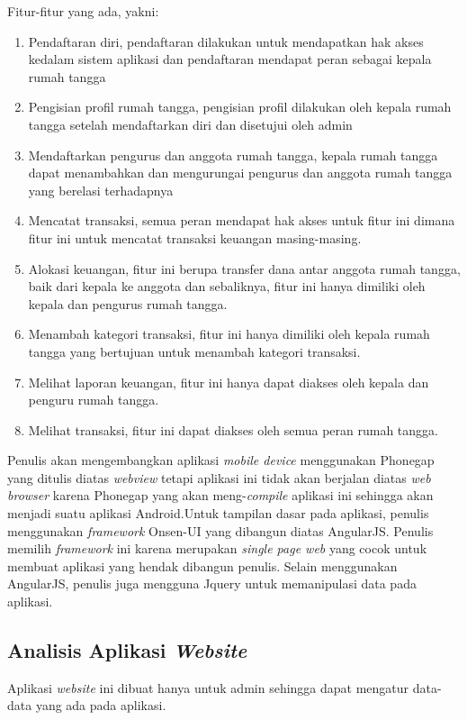 Fitur-fitur yang ada, yakni:
\begin{enumerate}
	\item Pendaftaran diri, pendaftaran dilakukan untuk mendapatkan hak akses kedalam sistem aplikasi dan pendaftaran mendapat peran sebagai kepala rumah tangga
	\item Pengisian profil rumah tangga, pengisian profil dilakukan oleh kepala rumah tangga setelah mendaftarkan diri dan disetujui oleh admin
	\item	Mendaftarkan pengurus dan anggota rumah tangga, kepala rumah tangga dapat menambahkan dan mengurungai pengurus dan anggota rumah tangga yang berelasi terhadapnya
	\item Mencatat transaksi, semua peran mendapat hak akses untuk fitur ini dimana fitur ini untuk mencatat transaksi keuangan masing-masing.
	\item Alokasi keuangan, fitur ini berupa transfer dana antar anggota rumah tangga, baik dari kepala ke anggota dan sebaliknya, fitur ini hanya dimiliki oleh kepala dan pengurus rumah tangga.
	\item Menambah kategori transaksi, fitur ini hanya dimiliki oleh kepala rumah tangga yang bertujuan untuk menambah kategori transaksi.
	\item Melihat laporan keuangan, fitur ini hanya dapat diakses oleh kepala dan penguru rumah tangga.
	\item Melihat transaksi, fitur ini dapat diakses oleh semua peran rumah tangga.
\end{enumerate}

Penulis akan mengembangkan aplikasi \textit{mobile device} menggunakan Phonegap yang ditulis diatas \textit{webview} tetapi aplikasi ini tidak akan berjalan diatas \textit{web browser} karena Phonegap yang akan meng-\textit{compile} aplikasi ini sehingga akan menjadi suatu aplikasi Android.Untuk tampilan dasar pada aplikasi, penulis menggunakan \textit{framework} Onsen-UI yang dibangun diatas AngularJS. Penulis memilih \textit{framework} ini karena merupakan \textit{single page web} yang cocok untuk membuat aplikasi yang hendak dibangun penulis. Selain menggunakan AngularJS, penulis juga mengguna Jquery untuk memanipulasi data pada aplikasi.


\subsection{Analisis Aplikasi \textit{Website}}

\hspace{0,5cm}Aplikasi \textit{website} ini dibuat hanya untuk admin sehingga dapat mengatur data-data yang ada pada aplikasi.

